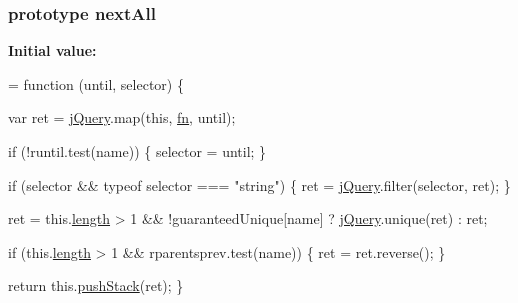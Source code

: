 \subsubsection[{\texorpdfstring{next\+All}{nextAll}}]{ {\bf prototype} next\+All}\hypertarget{jquery-2_82_81-vsdoc_8js_ab697a9d23cedbe3a7f45e620bd250001}{}\label{jquery-2_82_81-vsdoc_8js_ab697a9d23cedbe3a7f45e620bd250001}
{\bfseries Initial value\+:}
\begin{DoxyCode}
= \textcolor{keyword}{function} (until, selector) \{
        

        var ret = \hyperlink{jquery-2_82_81-vsdoc_8js_add5237586d970a38a81f990e8eb28c6c}{jQuery}.map(\textcolor{keyword}{this}, \hyperlink{jquery-2_82_81-vsdoc_8js_acef6bdaf6b9b20fdcca1ea86f0902c3b}{fn}, until);

        \textcolor{keywordflow}{if} (!runtil.test(name)) \{
            selector = until;
        \}

        \textcolor{keywordflow}{if} (selector && typeof selector === \textcolor{stringliteral}{"string"}) \{
            ret = \hyperlink{jquery-2_82_81-vsdoc_8js_add5237586d970a38a81f990e8eb28c6c}{jQuery}.filter(selector, ret);
        \}

        ret = this.\hyperlink{jquery-2_82_81-vsdoc_8js_aa7de35d58da66d9944ab9cbe82c19640}{length} > 1 && !guaranteedUnique[name] ? \hyperlink{jquery-2_82_81-vsdoc_8js_add5237586d970a38a81f990e8eb28c6c}{jQuery}.unique(ret) : ret;

        \textcolor{keywordflow}{if} (this.\hyperlink{jquery-2_82_81-vsdoc_8js_aa7de35d58da66d9944ab9cbe82c19640}{length} > 1 && rparentsprev.test(name)) \{
            ret = ret.reverse();
        \}

        \textcolor{keywordflow}{return} this.\hyperlink{jquery-2_82_81-vsdoc_8js_afc3a7db1ef2b526338c06c07cecccd44}{pushStack}(ret);
    \}
\end{DoxyCode}
